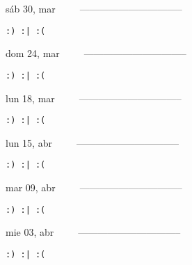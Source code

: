 \documentclass[letterpaper,10pt]{article}
\begin{document}
\begin{multicols}{3}
{sáb 30, mar\ \ \ \ \ --------------------------------}
\begin{flushright}\begin{small}\texttt{:) :| :(}\end{small}\end{flushright}
\vfill
{dom 24, mar\ \ \ \ \ --------------------------------}
\begin{flushright}\begin{small}\texttt{:) :| :(}\end{small}\end{flushright}\par
\vfill
{lun 18, mar\ \ \ \ \ --------------------------------}
\begin{flushright}\begin{small}\texttt{:) :| :(}\end{small}\end{flushright}\par
\vfill
\end{multicols}
\vspace{1.05cm}

\begin{multicols}{3}
{lun 15, abr\ \ \ \ \ --------------------------------}
\begin{flushright}\begin{small}\texttt{:) :| :(}\end{small}\end{flushright}
\vfill
{mar 09, abr\ \ \ \ \ --------------------------------}
\begin{flushright}\begin{small}\texttt{:) :| :(}\end{small}\end{flushright}\par
\vfill
{mie 03, abr\ \ \ \ \ --------------------------------}
\begin{flushright}\begin{small}\texttt{:) :| :(}\end{small}\end{flushright}\par
\vfill
\end{multicols}
\vspace{1.05cm}
\end{document}
